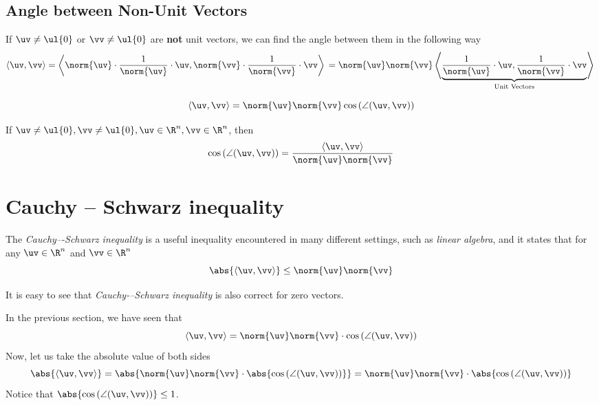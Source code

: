 \subsection{Angle between Non-Unit Vectors}
If $\uv \not=\ul{0}$ or $\vv \not=\ul{0}$ are \textbf{not} unit vectors, we can find the angle between them in the following way
\[
\langle\uv,\vv\rangle = \left\langle \norm{\uv}\cdot\frac{1}{\norm{\uv}} \cdot \uv,\norm{\vv}\cdot\frac{1}{\norm{\vv}} \cdot \vv\right\rangle\\
= \norm{\uv}\norm{\vv}\left\langle \underbrace{\frac{1}{\norm{\uv}} \cdot \uv,\frac{1}{\norm{\vv}} \cdot \vv}_{\text{Unit Vectors}}\right\rangle\\
\]

\[
\langle\uv,\vv\rangle = \norm{\uv}\norm{\vv}\cos\left( \angle(\uv,\vv)\right)
\]

\begin{lemma}
If $\uv\not=\ul{0},\vv\not=\ul{0}, \uv\in\R^n,\vv\in\R^n$, then
\[\cos\left(\angle(\uv,\vv) \right) = \frac{\langle \uv,\vv\rangle}{\norm{\uv}\norm{\vv}}\]
\end{lemma}

\section{Cauchy – Schwarz inequality}
\begin{lemma}
The \textit{Cauchy–-Schwarz inequality} is a useful inequality encountered in many different settings, such as \textit{linear algebra}, and it states that
for any $\uv\in\R^n$ and $\vv\in\R^n$
\[\abs{\langle\uv,\vv\rangle}\leq\norm{\uv}\norm{\vv}\]
\end{lemma}
\begin{remark}
It is easy to see that \textit{Cauchy-–Schwarz inequality} is also correct for zero vectors.
\end{remark}

\begin{note}
In the previous section, we have seen that
$$\langle\uv,\vv\rangle = \norm{\uv}\norm{\vv}\cdot\cos\left( \angle(\uv,\vv)\right)$$
Now, let us take the absolute value of both sides
\[\abs{\langle\uv,\vv\rangle} = \abs{\norm{\uv}\norm{\vv}\cdot\abs{\cos\left( \angle(\uv,\vv)\right)}}=\norm{\uv}\norm{\vv}\cdot\abs{\cos\left( \angle(\uv,\vv)\right)}
\]
Notice that $\abs{\cos\left( \angle(\uv,\vv)\right)}\leq 1$.
\end{note}
